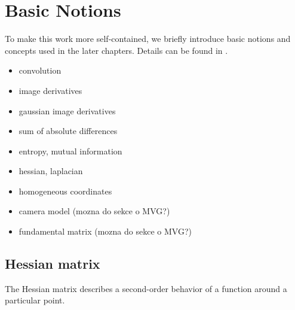 \chapter{Basic Notions} 

To make this work more self-contained, we briefly introduce basic notions and concepts used in the later chapters. 
Details can be found in .

\begin{framed} 
\begin{itemize} 
\item convolution 
\item image derivatives 
\item gaussian image derivatives 
\item sum of absolute differences 
\item entropy, mutual information 
\item hessian, laplacian 
\item homogeneous coordinates 
\item camera model (mozna do sekce o MVG?) 
\item fundamental matrix (mozna do sekce o MVG?) 
\end{itemize} 
\end{framed} 

\section{Hessian matrix}

The Hessian matrix describes a second-order behavior of a function around a particular point. 

